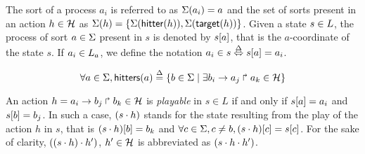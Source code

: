 \noindent
The sort of a process $a_i$ is referred to as $\Sigma(a_i)=a$ and the set of
sorts present in an action $h\in\mathcal{H}$ as 
$\Sigma(h) = \{\Sigma(\mathsf{hitter}(h)),\Sigma(\mathsf{target}(h))\}$.
Given a state $s\in L$, the process of sort $a\in\Sigma$ present in $s$ is
denoted by ${s[a]}$, that is the $a$-coordinate of the state $s$.
If $a_i\in L_a$, we define the notation $a_i\in s \stackrel{\Delta}\Leftrightarrow {s[a]}=a_i$.

\begin{equation}
\forall a \in \Sigma, \mathsf{hitters}(a) \stackrel{\Delta}= \{b \in \Sigma \mid \exists b_i\rightarrow a_j\Rsh a_k\in\mathcal{H} \}
\label{eq:ph_direct_predec}
\end{equation}

An action $h=a_i\rightarrow b_j\Rsh b_k \in\mathcal{H}$ is \emph{playable} in $s\in L$
if and only if ${s[a]}=a_i$ and ${s[b]}=b_j$.
In such a case, $(s\cdot h)$ stands for the state resulting from the play of
the action $h$ in $s$, that is 
${(s\cdot h)[b]} = b_k$ and 
$\forall c\in\Sigma, c\neq b, {(s\cdot h)[c]} = {s[c]}$.
For the sake of clarity, $((s\cdot h)\cdot h')$, $h'\in\mathcal{H}$ is abbreviated as
$(s\cdot h\cdot h')$.

\medskip



